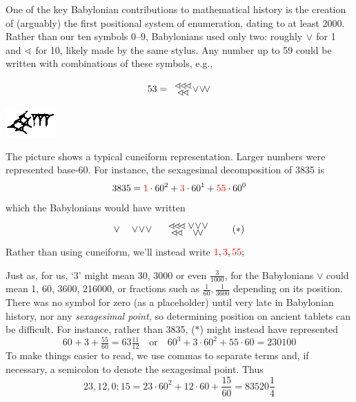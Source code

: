 One of the key Babylonian contributions to mathematical history is the creation of (arguably) the first positional system of enumeration, dating to at least 2000\BC. Rather than our ten symbols 0--9, Babylonians used only two: roughly $\vee$ for 1 and $\sphericalangle$ for 10, likely made by the same stylus. Any number up to 59 could be written with combinations of these symbols, e.g.,\par
\begin{minipage}[t]{0.8\linewidth}\vspace{-10pt}
	\[
		53=
		\begin{array}{c}
			\bten\!\bten\!\bten\\[-5pt]
			\bten\!\bten
		\end{array}
		\hspace{-7pt}
		\bone\!\bone\!\bone
	\]
\end{minipage}
\hfill
\begin{minipage}[t]{0.19\linewidth}\vspace{0pt}
	\flushright
	\includegraphics{babylon53}
\end{minipage}
\medbreak
The picture shows a typical cuneiform representation. Larger numbers were represented base-60. For instance, the sexagesimal decomposition of 3835 is
\[
	3835=\textcolor{red}{1}\cdot 60^2+\textcolor{red}{3}\cdot 60^1+\textcolor{red}{55}\cdot 60^0
\]
which the Babylonians would have written
\[
	\vee\quad \vee\!\vee\!\vee\quad 
	\begin{array}{c}
		\bten\!\bten\!\bten\\[-5pt]
		\bten\!\bten
	\end{array}
	\hspace{-8pt}
	\begin{array}{c}
		\bone\!\bone\!\bone\\[-5pt]
		\bone\!\bone
	\end{array}
	\tag{$\ast$}
\]
Rather than using cuneiform, we'll instead write $\textcolor{red}{1},\textcolor{red}{3},\textcolor{red}{55};$

\goodbreak

Just as, for us, `3' might mean 30, 3000 or even $\frac 3{1000}$, for the Babylonians $\vee$ could mean 1, 60, 3600, 216000, or fractions such as $\frac 1{60},\frac 1{3600}$ depending on its position. There was no symbol for zero (as a placeholder) until very late in Babylonian history, nor any \emph{sexagesimal point,} so determining position on ancient tablets can be difficult. For instance, rather than 3835, ($\ast$) might instead have represented
\[
	60+3+\tfrac{55}{60}=63\tfrac{11}{12}\quad\text{or}\quad 60^3+3\cdot 60^2+55\cdot 60=230100
\]
To make things easier to read, we use commas to separate terms and, if necessary, a semicolon to denote the sexagesimal point. Thus
\[
	23,12,0;15=23\cdot 60^2+12\cdot 60+\frac{15}{60}=83520\frac 14
\] 

